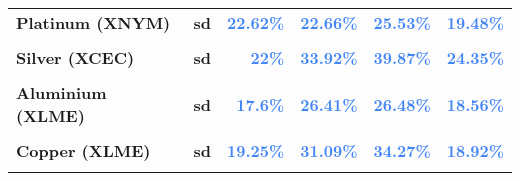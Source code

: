\documentclass[
  authoryear,
  preprint,
  3p]{elsarticle}
\begin{document}
\begin{longtable}[t]{>{}l>{}l>{}r>{}r>{}r>{}r}
\addlinespace
\textbf{Platinum (XNYM)} & \textbf{sd} & \textcolor[HTML]{4285f4}{\textbf{22.62\%}} & \textcolor[HTML]{4285f4}{\textbf{22.66\%}} & \textcolor[HTML]{4285f4}{\textbf{25.53\%}} & \textcolor[HTML]{4285f4}{\textbf{19.48\%}}\\
\textbf{\cellcolor{gray!10}{Silver (XCEC)}} & \textbf{\cellcolor{gray!10}{mean}} & \textcolor[HTML]{4285f4}{\textbf{\cellcolor{gray!10}{6.19\%}}} & \textcolor[HTML]{4285f4}{\textbf{\cellcolor{gray!10}{17.54\%}}} & \textcolor[HTML]{4285f4}{\textbf{\cellcolor{gray!10}{21.96\%}}} & \textcolor[HTML]{4285f4}{\textbf{\cellcolor{gray!10}{-2.43\%}}}\\
\textbf{Silver (XCEC)} & \textbf{sd} & \textcolor[HTML]{4285f4}{\textbf{22\%}} & \textcolor[HTML]{4285f4}{\textbf{33.92\%}} & \textcolor[HTML]{4285f4}{\textbf{39.87\%}} & \textcolor[HTML]{4285f4}{\textbf{24.35\%}}\\
\textbf{\cellcolor{gray!10}{Aluminium (XLME)}} & \textbf{\cellcolor{gray!10}{mean}} & \textcolor[HTML]{4285f4}{\textbf{\cellcolor{gray!10}{1.13\%}}} & \textcolor[HTML]{4285f4}{\textbf{\cellcolor{gray!10}{13.78\%}}} & \textcolor[HTML]{4285f4}{\textbf{\cellcolor{gray!10}{-3.58\%}}} & \textcolor[HTML]{4285f4}{\textbf{\cellcolor{gray!10}{3.15\%}}}\\
\textbf{Aluminium (XLME)} & \textbf{sd} & \textcolor[HTML]{4285f4}{\textbf{17.6\%}} & \textcolor[HTML]{4285f4}{\textbf{26.41\%}} & \textcolor[HTML]{4285f4}{\textbf{26.48\%}} & \textcolor[HTML]{4285f4}{\textbf{18.56\%}}\\
\addlinespace
\textbf{\cellcolor{gray!10}{Copper (XLME)}} & \textbf{\cellcolor{gray!10}{mean}} & \textcolor[HTML]{4285f4}{\textbf{\cellcolor{gray!10}{0.45\%}}} & \textcolor[HTML]{4285f4}{\textbf{\cellcolor{gray!10}{**28.59\%}}} & \textcolor[HTML]{4285f4}{\textbf{\cellcolor{gray!10}{5.74\%}}} & \textcolor[HTML]{4285f4}{\textbf{\cellcolor{gray!10}{0.03\%}}}\\
\textbf{Copper (XLME)} & \textbf{sd} & \textcolor[HTML]{4285f4}{\textbf{19.25\%}} & \textcolor[HTML]{4285f4}{\textbf{31.09\%}} & \textcolor[HTML]{4285f4}{\textbf{34.27\%}} & \textcolor[HTML]{4285f4}{\textbf{18.92\%}}\\
\textbf{\cellcolor{gray!10}{Lead (XLME)}} & \textbf{\cellcolor{gray!10}{mean}} & \textcolor[HTML]{4285f4}{\textbf{\cellcolor{gray!10}{3.83\%}}} & \textcolor[HTML]{4285f4}{\textbf{\cellcolor{gray!10}{28.99\%}}} & \textcolor[HTML]{4285f4}{\textbf{\cellcolor{gray!10}{10.74\%}}} & \textcolor[HTML]{4285f4}{\textbf{\cellcolor{gray!10}{2.07\%}}}\\

\end{longtable}
\end{document}
